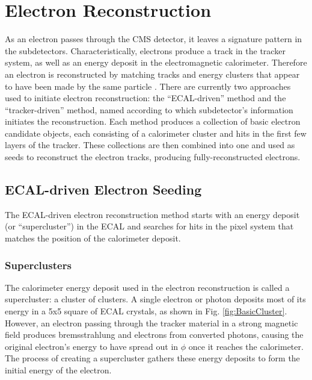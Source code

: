 \section{Electron Reconstruction}
\label{evReco:elec}
As an electron 
passes through the CMS detector, 
it leaves a signature pattern in the subdetectors.  
Characteristically, electrons produce a track 
in the tracker system, 
as well as an energy deposit in the 
electromagnetic calorimeter.  
Therefore an electron is reconstructed 
by matching tracks and energy clusters 
that appear to have been made by the same particle 
\cite{CMS-NOTE-2006-040}.  
There are currently two approaches used to 
initiate electron reconstruction: 
the ``ECAL-driven'' method and 
the ``tracker-driven'' method, 
named according to which subdetector's 
information initiates the reconstruction.  
Each method produces a collection of 
basic electron candidate objects, 
each consisting of a calorimeter cluster 
and hits in the first few layers of the tracker.  
These collections are then combined into one 
and used as seeds to reconstruct the electron tracks, 
producing fully-reconstructed electrons.  

\subsection{ECAL-driven Electron Seeding}
\label{evReco:ecalDrv}

The ECAL-driven electron reconstruction method 
starts with an energy deposit (or ``supercluster'') 
in the ECAL 
and searches for hits in the 
pixel system that matches the 
position of the calorimeter deposit.  

\subsubsection{Superclusters}
\label{evReco:SC}

The calorimeter energy deposit used in the electron 
reconstruction is called a supercluster: 
a cluster of clusters.  
A single electron or photon deposits most of its energy 
in a 5x5 square of ECAL crystals, 
as shown in Fig. \ref{fig:BasicCluster}.  
However, an electron passing through the tracker material 
in a strong magnetic field produces 
bremsstrahlung and electrons from converted photons, 
causing the original electron's energy to 
have spread out in $\phi$ once it reaches the calorimeter.  
The process of creating a supercluster gathers these 
energy deposits to form the initial energy of the electron.  


